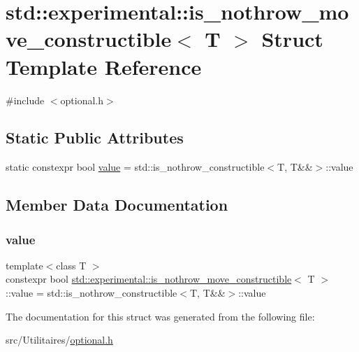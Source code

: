 \hypertarget{structstd_1_1experimental_1_1is__nothrow__move__constructible}{}\section{std\+:\+:experimental\+:\+:is\+\_\+nothrow\+\_\+move\+\_\+constructible$<$ T $>$ Struct Template Reference}
\label{structstd_1_1experimental_1_1is__nothrow__move__constructible}


{\ttfamily \#include $<$optional.\+h$>$}

\subsection*{Static Public Attributes}
\begin{DoxyCompactItemize}
\item 
static constexpr bool \mbox{\hyperlink{structstd_1_1experimental_1_1is__nothrow__move__constructible_a3dfc956c352cb27873ec02dbf4f0cb93}{value}} = std\+::is\+\_\+nothrow\+\_\+constructible$<$T, T\&\&$>$\+::value
\end{DoxyCompactItemize}


\subsection{Member Data Documentation}
\mbox{\label{structstd_1_1experimental_1_1is__nothrow__move__constructible_a3dfc956c352cb27873ec02dbf4f0cb93}} 
\subsubsection{\texorpdfstring{value}{value}}
{\footnotesize\ttfamily template$<$class T $>$ \\
constexpr bool \mbox{\hyperlink{structstd_1_1experimental_1_1is__nothrow__move__constructible}{std\+::experimental\+::is\+\_\+nothrow\+\_\+move\+\_\+constructible}}$<$ T $>$\+::value = std\+::is\+\_\+nothrow\+\_\+constructible$<$T, T\&\&$>$\+::value\hspace{0.3cm}{\ttfamily [static]}}



The documentation for this struct was generated from the following file\+:\begin{DoxyCompactItemize}
\item 
src/\+Utilitaires/\mbox{\hyperlink{optional_8h}{optional.\+h}}\end{DoxyCompactItemize}
